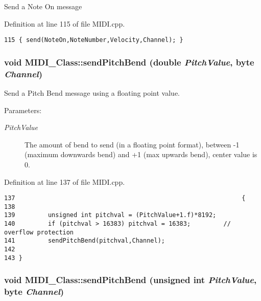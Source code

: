 Send a Note On message 

Definition at line 115 of file MIDI.cpp.

\begin{Code}\begin{verbatim}115 { send(NoteOn,NoteNumber,Velocity,Channel); }
\end{verbatim}
\end{Code}


\hypertarget{class_m_i_d_i___class_16800e955a1d0d66e6bda6727588b1eb}{
\subsubsection[{sendPitchBend}]{\setlength{\rightskip}{0pt plus 5cm}void MIDI\_\-Class::sendPitchBend (double {\em PitchValue}, \/  byte {\em Channel})}}
\label{class_m_i_d_i___class_16800e955a1d0d66e6bda6727588b1eb}


Send a Pitch Bend message using a floating point value. \begin{Desc}
\item[Parameters:]
\begin{description}
\item[{\em PitchValue}]The amount of bend to send (in a floating point format), between -1 (maximum downwards bend) and +1 (max upwards bend), center value is 0. \end{description}
\end{Desc}


Definition at line 137 of file MIDI.cpp.

\begin{Code}\begin{verbatim}137                                                              {
138 
139         unsigned int pitchval = (PitchValue+1.f)*8192;
140         if (pitchval > 16383) pitchval = 16383;         // overflow protection
141         sendPitchBend(pitchval,Channel);
142         
143 }
\end{verbatim}
\end{Code}


\hypertarget{class_m_i_d_i___class_45dcd73e3b8a107334e687750514f8b5}{
\subsubsection[{sendPitchBend}]{\setlength{\rightskip}{0pt plus 5cm}void MIDI\_\-Class::sendPitchBend (unsigned int {\em PitchValue}, \/  byte {\em Channel})}}
\label{class_m_i_d_i___class_45dcd73e3b8a107334e687750514f8b5}


